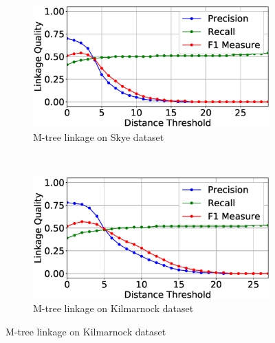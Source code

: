 \documentclass{llncs}
\begin{document}
\begin{figure}[t]
\centering
\begin{subfigure}{.47\textwidth}
  \centering
\includegraphics[width=\textwidth]{figures/plotLQ-skye-mtree}
\vspace{-6mm}
\caption{M-tree linkage on Skye dataset\label{skye-quality-mtree}}
\end{subfigure}%
~~
\begin{subfigure}{.47\textwidth}
  \centering
\includegraphics[width=\textwidth]{figures/plotLQ-kilmarnock-mtree}
\vspace{-6mm}
\caption{M-tree linkage on Kilmarnock dataset \label{kilmarnock-quality-mtree}}
\end{subfigure} \vspace{4mm}


\end{figure}
\end{document}
